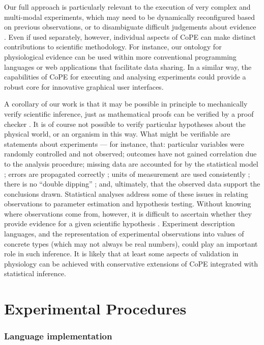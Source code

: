 \documentclass[11pt]{article}
\begin{document}
Our full approach is particularly relevant to the execution of very
complex and multi-modal experiments, which may need to be dynamically
reconfigured based on previous observations, or to disambiguate
difficult judgements about evidence \citep{Kriegeskorte2009}. Even
if used separately, however, individual aspects of CoPE can make
distinct contributions to scientific methodology. For instance, our
ontology for physiological evidence can be used within more
conventional programming languages or web applications that facilitate
data sharing. In a similar way, the capabilities of CoPE for executing
and analysing experiments could provide a robust core for innovative
graphical user interfaces.

A corollary of our work is that it may be possible in principle to
mechanically verify scientific inference, just as mathematical proofs
can be verified by a proof checker \citep{DeBruijn1968,
  Harrison2009}. It is of course not possible to verify particular
hypotheses about the physical world, or an organism in this way. What
might be verifiable are statements about experiments --- for instance,
that: particular variables were randomly controlled and not observed;
outcomes have not gained correlation due to the analysis procedure;
missing data are accounted for by the statistical model
\citep{Gelman2003}; errors are propagated correctly \citep{Taylor1997};
units of measurement are used consistently \citep{Kennedy1997}; there
is no ``double dipping'' \citep{Kriegeskorte2009}; and, ultimately,
that the observed data support the conclusions drawn. Statistical
analyses address some of these issues in relating observations to
parameter estimation and hypothesis testing. Without knowing
where observations come from, however, it is difficult to ascertain whether
they provide evidence for a given scientific hypothesis
\citep{Pool2002}. Experiment description languages, and the
representation of experimental observations into values of concrete
types (which may not always be real numbers), could play an important
role in such inference. It is likely that at least some aspects of
validation in physiology can be achieved with conservative extensions
of
CoPE integrated with statistical inference.

\section*{Experimental Procedures}

\subsubsection*{Language implementation}
\end{document}
